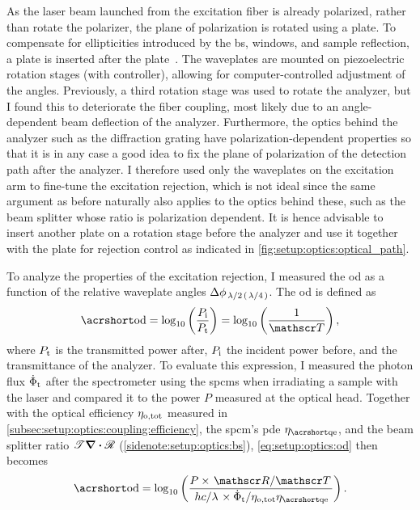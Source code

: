 As the laser beam launched from the excitation fiber is already polarized, rather than rotate the polarizer, the plane of polarization is rotated using a \halfwave plate.
To compensate for ellipticities introduced by the \gls{bs}, windows, and sample reflection, a \quarterwave plate is inserted after the \halfwave plate~\cite{Kuhlmann2013}.
The waveplates are mounted on piezoelectric rotation stages (\rotator with \rotatorcontroller controller), allowing for computer-controlled adjustment of the angles.
Previously, a third rotation stage was used to rotate the analyzer, but I found this to deteriorate the fiber coupling, most likely due to an angle-dependent beam deflection of the analyzer.
Furthermore, the optics behind the analyzer such as the diffraction grating have polarization-dependent properties so that it is in any case a good idea to fix the plane of polarization of the detection path after the analyzer.
I therefore used only the waveplates on the excitation arm to fine-tune the excitation rejection, which is not ideal since the same argument as before naturally also applies to the optics behind these, such as the beam splitter whose ratio is polarization dependent.
It is hence advisable to insert another \halfwave plate on a rotation stage before the analyzer and use it together with the \quarterwave plate for rejection control as indicated in \cref{fig:setup:optics:optical_path}.

To analyze the properties of the excitation rejection, I measured the \gls{od} as a function of the relative waveplate angles $\Delta\phi_{\halfwave(\quarterwave)}$.
The \gls{od} is defined as
\begin{equation}\label{eq:setup:optics:od}
    \OD = \log_{10}\left(\frac{P_{\mr{i}}}{P_{\mr{t}}}\right) = \log_{10}\left(\frac{1}{\transmittance}\right),
\end{equation}
where $P_{\mathrm{t}}$ is the transmitted power after, $P_{\mathrm{i}}$ the incident power before, and \transmittance the transmittance of the analyzer.
To evaluate this expression, I measured the photon flux $\dot{\Phi}_{\mathrm{t}}$ after the spectrometer using the \glspl{spcm} when irradiating a sample with the laser and compared it to the power $P$ measured at the optical head.
Together with the optical efficiency $\eta_{\mathrm{o,tot}}$ measured in \cref{subsec:setup:optics:coupling:efficiency}, the \gls{spcm}'s \gls{pde} $\eta_{\QE}$, and the beam splitter ratio $\mathscr{T}\div\mathscr{R}$ (\cf \cref{sidenote:setup:optics:bs}), \cref{eq:setup:optics:od} then becomes
\begin{equation}\label{eq:setup:optics:od:eval}
    \OD = \log_{10}\left(\frac{P\times\flatfrac{\reflectance}{\transmittance}}{\flatfrac{hc}{\lambda}\times\dot{\Phi}_{\mr{t}}/\eta_{\mr{o,tot}}\eta_{\QE}}\right).
\end{equation}

